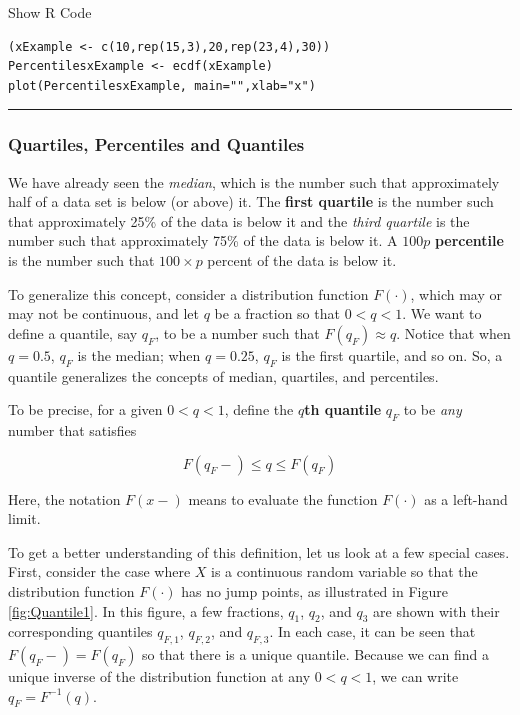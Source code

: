 \documentclass[]{book}
\theoremstyle{definition}
\theoremstyle{definition}
\theoremstyle{definition}
\theoremstyle{remark}
\begin{document}
Show R Code

\hypertarget{toggleToy}{}
\begin{verbatim}
(xExample <- c(10,rep(15,3),20,rep(23,4),30))
PercentilesxExample <- ecdf(xExample)
plot(PercentilesxExample, main="",xlab="x")
\end{verbatim}

\begin{center}\rule{0.5\linewidth}{\linethickness}\end{center}

\subsubsection{Quartiles, Percentiles and
Quantiles}\label{S:MS:QuantileEstimator}

We have already seen the \emph{median}, which is the number such that
approximately half of a data set is below (or above) it. The
\textbf{first quartile} is the number such that approximately 25\% of
the data is below it and the \emph{third quartile} is the number such
that approximately 75\% of the data is below it. A \(100p\)
\textbf{percentile} is the number such that \(100 \times p\) percent of
the data is below it.

To generalize this concept, consider a distribution function
\(F(\cdot)\), which may or may not be continuous, and let \(q\) be a
fraction so that \(0<q<1\). We want to define a quantile, say \(q_F\),
to be a number such that \(F(q_F) \approx q\). Notice that when
\(q = 0.5\), \(q_F\) is the median; when \(q = 0.25\), \(q_F\) is the
first quartile, and so on. So, a quantile generalizes the concepts of
median, quartiles, and percentiles.

To be precise, for a given \(0<q<1\), define the \(q\)\textbf{th
quantile} \(q_F\) to be \emph{any} number that satisfies

\begin{equation}
  F(q_F-) \le q \le F(q_F)
  \label{eq:Quantile}
\end{equation}

Here, the notation \(F(x-)\) means to evaluate the function \(F(\cdot)\)
as a left-hand limit.

To get a better understanding of this definition, let us look at a few
special cases. First, consider the case where \(X\) is a continuous
random variable so that the distribution function \(F(\cdot)\) has no
jump points, as illustrated in Figure \ref{fig:Quantile1}. In this
figure, a few fractions, \(q_1\), \(q_2\), and \(q_3\) are shown with
their corresponding quantiles \(q_{F,1}\), \(q_{F,2}\), and \(q_{F,3}\).
In each case, it can be seen that \(F(q_F-)= F(q_F)\) so that there is a
unique quantile. Because we can find a unique inverse of the
distribution function at any \(0<q<1\), we can write \(q_F= F^{-1}(q)\).
\end{document}
